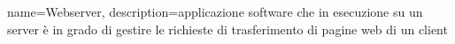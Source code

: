 {
	name={Webserver},
	description={applicazione software che in esecuzione su un server è in grado di gestire le richieste di trasferimento di pagine web di un client}
}